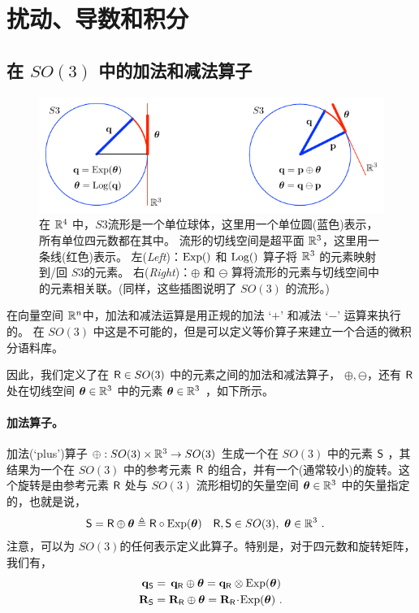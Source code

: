 \section{扰动、导数和积分}



\subsection{在 $SO(3)$ 中的加法和减法算子}

\begin{figure}[tb]
\centering
\includegraphics{figures/manifold}
\caption{在 ${\mathbb R}^4$ 中，$S3$流形是一个单位球体，这里用一个单位圆(蓝色)表示，所有单位四元数都在其中。
流形的切线空间是超平面 ${\mathbb R}^3$，这里用一条线(红色)表示。
左(\emph{Left})：$\operatorname*{Exp}()$ 和 $\operatorname*{Log}()$ 算子将 ${\mathbb R}^3$ 的元素映射到/回 $S3$的元素。
右(\emph{Right})：$\oplus$ 和 $\ominus$ 算将流形的元素与切线空间中的元素相关联。(同样，这些插图说明了 $SO(3)$ 的流形。)}
\label{fig:manifold}
\end{figure}

在向量空间 ${\mathbb R}^n$中，加法和减法运算是用正规的加法 `$+$' 和减法 `$-$' 运算来执行的。
在 $SO(3)$ 中这是不可能的，但是可以定义等价算子来建立一个合适的微积分语料库。 

因此，我们定义了在 $\mathsf R\in SO(3)$ 中的元素之间的加法和减法算子， $\oplus,\ominus$，还有 $\mathsf R$ 处在切线空间 ${\bm \theta}\in{\mathbb R}^3$ 中的元素 ${\bm \theta}\in{\mathbb R}^3$ ，如下所示。

\paragraph{加法算子。}
加法(`plus')算子 $\oplus:SO(3)\times{\mathbb R}^3\to SO(3)$ 生成一个在 $SO(3)$ 中的元素 $\mathsf S$ ，其结果为一个在 $SO(3)$ 中的参考元素 $\mathsf R$ 的组合，并有一个(通常较小)的旋转。这个旋转是由参考元素 $\mathsf R$ 处与 $SO(3)$ 流形相切的矢量空间 ${\bm \theta}\in{\mathbb R}^3$ 中的矢量指定的，也就是说，
%
\begin{align}
\mathsf S = \mathsf R\oplus {\bm \theta} &\triangleq \mathsf R\circ\operatorname*{Exp}({\bm \theta}) && \mathsf R,\mathsf S\in SO(3),~ {\bm \theta}\in{\mathbb R}^3 
~.
\end{align}
%
注意，可以为 $SO(3)$的任何表示定义此算子。特别是，对于四元数和旋转矩阵，我们有，
%
\begin{align}
{\bf q}_\mathsf S &= \,{\bf q}_\mathsf R\oplus{\bm \theta} = {\bf q}_\mathsf R\otimes\operatorname*{Exp}({\bm \theta}) \\
{\bf R}_\mathsf S &= {\bf R}_\mathsf R\oplus {\bm \theta} = {\bf R}_\mathsf R\!\cdot\!\operatorname*{Exp}({\bm \theta}) 
~.
\end{align}

